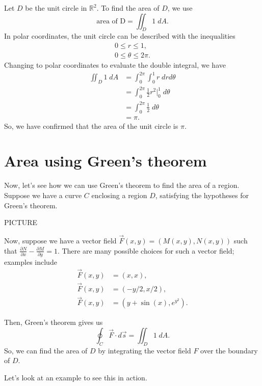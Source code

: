 \documentclass{ximera}
\begin{document}
\begin{example}
Let $D$ be the unit circle in $\mathbb{R}^2$. To find the area of $D$, we use
\[
\text{area of D} = \iint_D 1\;dA.
\]
In polar coordinates, the unit circle can be described with the inequalities
\begin{align*}
0\leq r\leq 1,\\
0\leq \theta\leq 2\pi.
\end{align*}
Changing to polar coordinates to evaluate the double integral, we have
\begin{align*}
\iint_D 1\;dA &= \int_0^{2\pi} \int_0^1 r\;drd\theta\\
&= \int_0^{2\pi} \frac{1}{2}r^2|_0^1\;d\theta\\
&= \int_0^{2\pi} \frac{1}{2}\;d\theta\\
&= \pi.
\end{align*}
So, we have confirmed that the area of the unit circle is $\pi$.
\end{example}

\section*{Area using Green's theorem}

Now, let's see how we can use Green's theorem to find the area of a region. Suppose we have a curve $C$ enclosing a region $D$, satisfying the hypotheses for Green's theorem.

PICTURE

Now, suppose we have a vector field $\vec{F}(x,y) = (M(x,y), N(x,y))$ such that $\frac{\partial N}{\partial x} - \frac{\partial M}{\partial y} = 1$. There are many possible choices for such a vector field; examples include
\begin{align*}
\vec{F}(x,y) &= (x,x),\\
\vec{F}(x,y) &= (-y/2, x/2),\\
\vec{F}(x,y) &= \left(y+\sin(x), e^{y^2}\right).
\end{align*}

Then, Green's theorem gives us
\[
\oint_{C}\vec{F}\cdot d\vec{s} = \iint_D 1\;dA.
\]
So, we can find the area of $D$ by integrating the vector field $F$ over the boundary of $D$.

Let's look at an example to see this in action.
\end{document}
